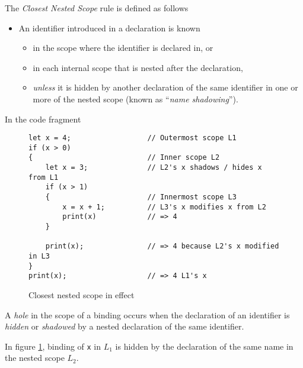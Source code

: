 \begin{definition}
    The \textit{Closest Nested Scope} rule is defined as follows
    \begin{itemize}
        \item An identifier introduced in a declaration is known
        \begin{itemize}
            \item in the scope where the identifier is declared in, or
            \item in each internal scope that is nested after the declaration,
            \item \textit{unless} it is hidden by another declaration of the same identifier in one or more of the nested scope (known as \enquote{\textit{name shadowing}}).
        \end{itemize}
    \end{itemize}
\end{definition}

\begin{example}
    In the code fragment
    \begin{figure}[H]
        \centering
        \begin{verbatim}
let x = 4;                  // Outermost scope L1
if (x > 0)
{                           // Inner scope L2
    let x = 3;              // L2's x shadows / hides x from L1
    if (x > 1)
    {                       // Innermost scope L3
        x = x + 1;          // L3's x modifies x from L2
        print(x)            // => 4
    }
    
    print(x);               // => 4 because L2's x modified in L3
}       
print(x);                   // => 4 L1's x
        \end{verbatim}
        \caption{Closest nested scope in effect}
        \label{prog:closest-nested-scope-rule}
    \end{figure}
\end{example}

\begin{definition}[Hole]
    A \textit{hole} in the scope of a binding occurs when the declaration of an identifier is \textit{hidden} or \textit{shadowed} by a nested declaration of the same identifier.
    
    In figure \ref{prog:closest-nested-scope-rule}, binding of \texttt{x} in $L_1$ is hidden by the declaration of the same name in the nested scope $L_2$.
\end{definition}

